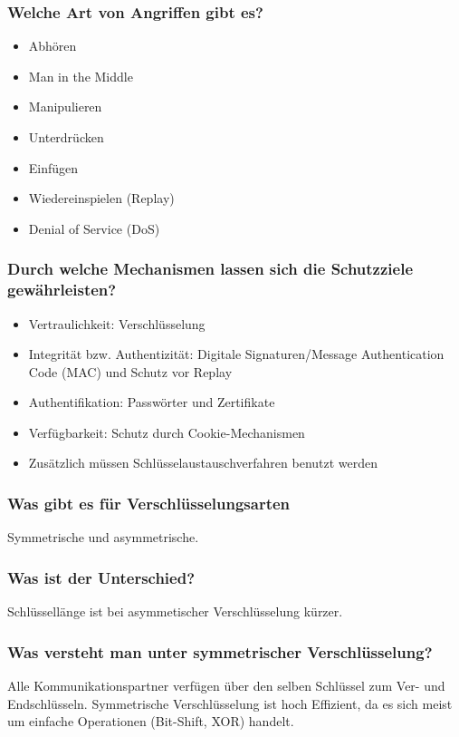 	\subsubsection{Welche Art von Angriffen gibt es?}
		\begin{itemize}
			\item Abhören
			\item Man in the Middle
			\item Manipulieren
			\item Unterdrücken
			\item Einfügen
			\item Wiedereinspielen (Replay)
			\item Denial of Service (DoS)
		\end{itemize}
		
	\subsubsection{Durch welche Mechanismen lassen sich die Schutzziele gewährleisten?}
	\begin{itemize}
		\item Vertraulichkeit: Verschlüsselung
		\item Integrität bzw. Authentizität: Digitale Signaturen/Message Authentication Code (MAC) und Schutz vor Replay
		\item Authentifikation: Passwörter und Zertifikate
		\item Verfügbarkeit: Schutz durch Cookie-Mechanismen
		\item Zusätzlich müssen Schlüsselaustauschverfahren benutzt werden
	\end{itemize}
	
		\subsubsection{Was gibt es für Verschlüsselungsarten}
	Symmetrische und asymmetrische.
	
		
	\subsubsection{Was ist der Unterschied?}
	Schlüssellänge ist bei asymmetischer Verschlüsselung kürzer.
	
	\subsubsection{Was versteht man unter symmetrischer Verschlüsselung?}
	Alle Kommunikationspartner verfügen über den selben Schlüssel zum Ver- und Endschlüsseln. Symmetrische Verschlüsselung ist hoch Effizient, da es sich meist um einfache Operationen (Bit-Shift, XOR) handelt.
	
